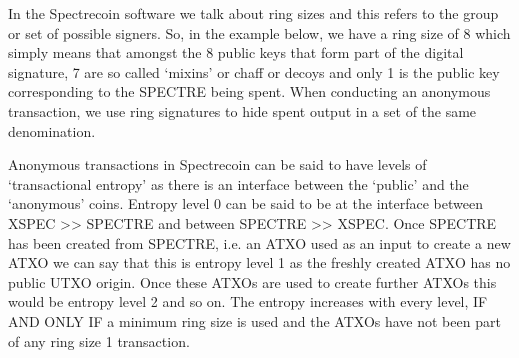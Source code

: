 In the Spectrecoin software we talk about ring sizes and this refers to the group or set of possible signers. 
So, in the example below, we have a ring size of 8 which simply means that amongst the 8 public keys that 
form part of the digital signature, 7 are so called ‘mixins’ or chaff or decoys and only 1 is the public key 
corresponding to the SPECTRE being spent. When conducting an anonymous transaction, we use ring 
signatures to hide spent output in a set of the same denomination. 

 

Anonymous transactions in Spectrecoin can be said to have levels of ‘transactional entropy’ as there is an 
interface between the ‘public’ and the ‘anonymous’ coins. Entropy level 0 can be said to be at the interface 
between XSPEC >> SPECTRE and between SPECTRE >> XSPEC. Once SPECTRE has been created from 
SPECTRE, i.e. an ATXO used as an input to create a new ATXO we can say that this is entropy level 1 as the 
freshly created ATXO has no public UTXO origin. Once these ATXOs are used to create further ATXOs this 
would be entropy level 2 and so on. The entropy increases with every level, IF AND ONLY IF a minimum 
ring size is used and the ATXOs have not been part of any ring size 1 transaction.